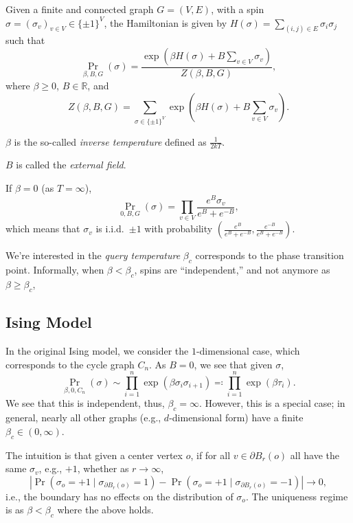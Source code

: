Given a finite and connected graph \(G = (V, E)\), with a spin \(\sigma = (\sigma _v)_{v \in V} \in \{ \pm 1 \} ^V\), the Hamiltonian is given by \(H(\sigma ) = \sum_{(i, j) \in E} \sigma _i \sigma _j\) such that
\[
	\Pr_{\beta , B, G}\left(\sigma \right)
	= \frac{\exp (\beta H(\sigma ) + B \sum_{v \in V} \sigma _v)}{Z(\beta , B, G)},
\]
where \(\beta \geq 0\), \(B \in \mathbb{R} \), and
\[
	Z(\beta , B, G)
	= \sum_{\sigma \in \{ \pm 1 \} ^V} \exp (\beta H(\sigma ) + B \sum_{v \in V} \sigma _v).
\]

\begin{notation}
	\(\beta \) is the so-called \emph{inverse temperature} defined as \(\frac{1}{2kT}\).
\end{notation}

\begin{notation}
	\(B\) is called the \emph{external field}.
\end{notation}

If \(\beta = 0\) (as \(T = \infty \)),
\[
	\Pr_{0, B, G}\left(\sigma \right)
	= \prod_{v \in V} \frac{e^B \sigma _v}{e^B +e^{-B}},
\]
which means that \(\sigma _v\) is i.i.d.\ \(\pm 1\) with probability \((\frac{e^B}{e^B + e^{-B}}, \frac{e^{-B}}{e^B + e^{-B}})\).

We're interested in the \emph{query temperature} \(\beta _c\) corresponds to the phase transition point. Informally, when \(\beta < \beta _c\), spins are ``independent,'' and not anymore as \(\beta \geq \beta _c\),

\subsection{Ising Model}
In the original Ising model, we consider the \(1\)-dimensional case, which corresponds to the cycle graph \(C_n\). As \(B = 0\), we see that given \(\sigma \),
\[
	\Pr_{\beta , 0, C_n}\left(\sigma \right)
	\sim \prod_{i=1}^{n} \exp (\beta \sigma _i \sigma _{i+1})
	\eqqcolon \prod_{i=1}^{n} \exp (\beta \tau _i).
\]
We see that this is independent, thus, \(\beta _c = \infty \). However, this is a special case; in general, nearly all other graphs (e.g., \(d\)-dimensional form) have a finite \(\beta _c \in (0 , \infty )\).

\begin{intuition}
	The intuition is that given a center vertex \(o\), if for all \(v \in \partial B_r(o)\) all have the same \(\sigma _v\), e.g., \(+1\), whether as \(r \to \infty \),
	\[
		\left\lvert \Pr_{}\left(\sigma _o = +1 \mid \sigma _{\partial B_r(o)} = 1 \right) - \Pr_{}\left(\sigma _o = +1 \mid \sigma _{\partial B_r(o)} = -1 \right) \right\rvert
		\to 0,
	\]
	i.e., the boundary has no effects on the distribution of \(\sigma _o\). The uniqueness regime is as \(\beta < \beta _c\) where the above holds.
\end{intuition}

